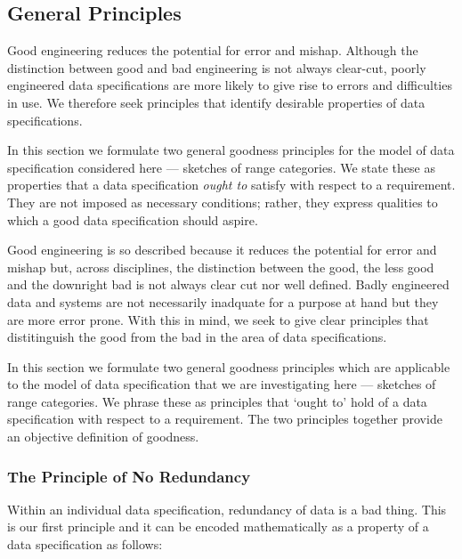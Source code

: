 \subsection{General Principles}
\begin{newtt} %
Good engineering reduces the potential for error and mishap. Although the
distinction between good and bad engineering is not always clear-cut,
poorly engineered data specifications are more likely to give rise to
errors and difficulties in use. We therefore seek principles that
identify desirable properties of data specifications.

In this section we formulate two general goodness principles for the
model of data specification considered here --- sketches of range
categories. We state these as properties that a data specification
\emph{ought to} satisfy with respect to a requirement. They are not
imposed as necessary conditions; rather, they express qualities to which
a good data specification should aspire.
\end{newtt}

\begin{oldtt} %
Good engineering is so described because it reduces the potential for error and mishap but, across disciplines, the distinction between the  good, the less good and the downright  bad is not always clear cut nor well defined.
Badly engineered data and systems are not necessarily inadquate for a purpose at hand but they are more error prone. With this in mind, we seek to give clear principles that distitinguish the good from the bad in the area of  data specifications.

In this section we formulate two general goodness principles which are applicable to  the model of data specification that we are investigating here
 --- sketches of range categories. 
We phrase these as principles that `ought to' hold of a data specification with respect to a requirement. 
The two principles together provide an objective definition  of goodness. 
\end{oldtt}

\subsubsection{The Principle of No Redundancy}
Within an individual data specification, redundancy of data is a bad thing. This is our first principle and it can be encoded mathematically as a property of a data specification as follows:

